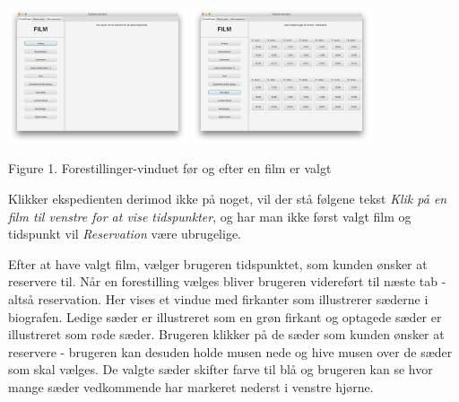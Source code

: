 \documentclass[final]{rapport1}
\begin{document}
\begin{picture}

\includegraphics[width=150pt]{1.png}
\includegraphics[width=150pt]{2.png}

\end{picture}
\begin{center}
\tiny Figure 1. Forestillinger-vinduet før og efter en film er valgt
\end{center}

Klikker ekspedienten derimod ikke på noget, vil der stå følgene tekst \emph{Klik på en film til venstre for at vise tidspunkter}, og har man ikke først valgt film og tidspunkt vil \emph{Reservation} være ubrugelige.

Efter at have valgt film, vælger brugeren tidspunktet, som kunden ønsker at reservere til. Når en forestilling vælges bliver brugeren videreført til næste tab - altså reservation. Her vises et vindue med firkanter som illustrerer sæderne i biografen. Ledige sæder er illustreret som en grøn firkant og optagede sæder er illustreret som røde sæder. Brugeren klikker på de sæder som kunden ønsker at reservere - brugeren kan desuden holde musen nede og hive musen over de sæder som skal vælges. De valgte sæder skifter farve til blå og brugeren kan se hvor mange sæder vedkommende har markeret nederst i venstre hjørne. 
\end{document}
